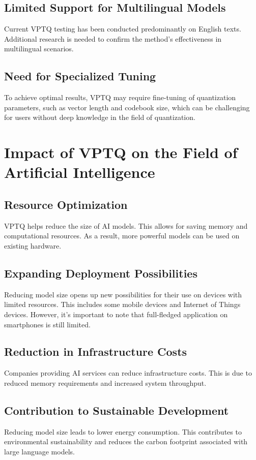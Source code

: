 \documentclass{article}
\begin{document}
\subsection{Limited Support for Multilingual Models}
Current VPTQ testing has been conducted predominantly on English texts. Additional research is needed to confirm the method's effectiveness in multilingual scenarios.

\subsection{Need for Specialized Tuning}
To achieve optimal results, VPTQ may require fine-tuning of quantization parameters, such as vector length and codebook size, which can be challenging for users without deep knowledge in the field of quantization.

\section{Impact of VPTQ on the Field of Artificial Intelligence}

\subsection{Resource Optimization}
VPTQ helps reduce the size of AI models. This allows for saving memory and computational resources. As a result, more powerful models can be used on existing hardware.

\subsection{Expanding Deployment Possibilities}
Reducing model size opens up new possibilities for their use on devices with limited resources. This includes some mobile devices and Internet of Things devices. However, it's important to note that full-fledged application on smartphones is still limited.

\subsection{Reduction in Infrastructure Costs}
Companies providing AI services can reduce infrastructure costs. This is due to reduced memory requirements and increased system throughput.

\subsection{Contribution to Sustainable Development}
Reducing model size leads to lower energy consumption. This contributes to environmental sustainability and reduces the carbon footprint associated with large language models.
\end{document}
